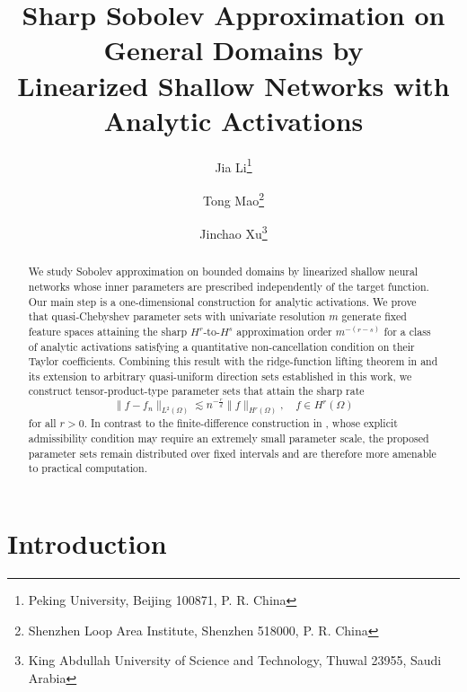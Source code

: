 \documentclass{article}
\title{Sharp Sobolev Approximation on General Domains by\\ Linearized Shallow Networks with Analytic Activations}
\author{Jia Li\thanks{Peking University, Beijing 100871, P. R. China}\and Tong Mao\thanks{Shenzhen Loop Area Institute, Shenzhen 518000, P. R. China}\and Jinchao Xu\thanks{King Abdullah University of Science and Technology, Thuwal 23955, Saudi Arabia}}
\date{}
\numberwithin{equation}{section}
\begin{document}
\maketitle

\begin{abstract}
We study Sobolev approximation on bounded domains by linearized shallow neural networks whose inner parameters are prescribed independently of the target function. Our main step is a one-dimensional construction for analytic activations. We prove that quasi-Chebyshev parameter sets with univariate resolution $m$ generate fixed feature spaces attaining the sharp $H^r$-to-$H^s$ approximation order $m^{-(r-s)}$ for a class of analytic activations satisfying a quantitative non-cancellation condition on their Taylor coefficients. Combining this result with the ridge-function lifting theorem in \cite{petrushev1998approximation} and its extension to arbitrary quasi-uniform direction sets established in this work, we construct tensor-product-type parameter sets that attain the sharp rate
$$\|f-f_n\|_{L^2(\Omega)}\lesssim n^{-\frac rd}\|f\|_{H^r(\Omega)},\quad f\in H^r(\Omega)$$
for all $r>0$. In contrast to the finite-difference construction in \cite{mhaskar1996neural}, whose explicit admissibility condition may require an extremely small parameter scale, the proposed parameter sets remain distributed over fixed intervals and are therefore more amenable to practical computation.
\end{abstract}

\section{Introduction}\label{sec:introduction}
\end{document}
